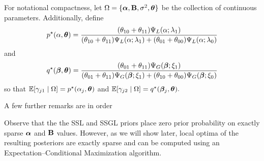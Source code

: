 For notational compactness, let $\Omega = \{\boldsymbol{\alpha}, \mathbf{B}, \sigma^{2}, \boldsymbol{\theta}\}$ be the collection of continuous parameters. 
Additionally, define
$$
p^{\star}(\alpha, \boldsymbol{\theta}) = \frac{(\theta_{10} + \theta_{11})\Psi_{L}(\alpha; \lambda_{1})}{(\theta_{10} + \theta_{11})\Psi_{L}(\alpha; \lambda_{1}) + (\theta_{01} + \theta_{00})\Psi_{L}(\alpha; \lambda_{0})}
$$
and
$$
q^{\star}(\boldsymbol{\beta}, \boldsymbol{\theta}) = \frac{(\theta_{01} + \theta_{11})\Psi_{G}(\boldsymbol{\beta}; \xi_{1})}{(\theta_{01} + \theta_{11})\Psi_{G}(\boldsymbol{\beta}; \xi_{1}) + (\theta_{10} + \theta_{00})\Psi_{G}(\boldsymbol{\beta}; \xi_{0})}
$$
so that $\mathbb{E}[\gamma_{j1} \mid \Omega] = p^{\star}(\alpha_{j}, \boldsymbol{\theta})$ and $\mathbb{E}[\gamma_{j2} \mid \Omega] = q^{\star}(\boldsymbol{\beta}_{j}, \boldsymbol{\theta}).$




A few further remarks are in order
\begin{remark}
Observe that the the SSL and SSGL priors place zero prior probability on exactly sparse $\boldsymbol{\alpha}$ and $\mathbf{B}$ values. 
However, as we will show later, local optima of the resulting posteriors are exactly sparse and can be computed using an Expectation--Conditional Maximization algorithm.
\end{remark}

